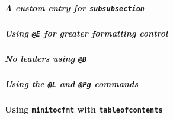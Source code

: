 \documentclass{article}
\makeatletter
\def\cs#1{\texttt{\@backslashchar#1}}
\newcommand{\insMinitoc}[2][]{%
  \begin{center}#2
  \begin{minipage}[c]{0.8\linewidth}
  \insertminitoc[#1]
  \end{minipage}
  \end{center}
}
\makeatother
\begin{document}
\subparagraph{A custom entry for \protect\cs{subsubsection}} \leavevmode

\insMinitoc[CandM]\minitocFmtvi

\subparagraph{Using \texorpdfstring{\protect\cs{@E}}{\textbackslash{@E}} for greater formatting control} \leavevmode

\begin{minitocfmt}{\minitocFmtF}
  {\@W{2em}\@D{0em}
   }
  {\@W{2.5em}\@D{2em}
   {\@F{\color{blue}}}{}}
\end{minitocfmt}
\insMinitoc[CandM]{\minitocFmtF}

\subparagraph{No leaders using \texorpdfstring{\protect\cs{@B}}{\textbackslash{@B}}} \leavevmode

\begin{minitocfmt}{\minitocFmtB}
  {\vspace{6pt}\@W{2em}\@B{0em}\@F{\bfseries}\@N{\bfseries}\@P{\bfseries}}
  {\@W{2.5em}\@D{2em}}
\end{minitocfmt}

\insMinitoc[CandM]\minitocFmtB

\subparagraph{Using the
  \texorpdfstring{\protect\cs{@L} and \protect\cs{@Pg}}{\textbackslash{@L}
    and \textbackslash{@Pg}} commands} \leavevmode

\begin{minitocfmt}{\minitocFmtPara} %
\@A{\@PW{2.5em}\@R{7em}}
  {%
    \@W{3.2em}\@D{0em}
      {}
      {}
  }
  {%
    \@W{4.1em}\@D{3.2em}
      {}
      {}
  }
\end{minitocfmt}

\insMinitoc[SExmpls]{\minitocFmtPara}

\paragraph{Using \texorpdfstring{\texttt{minitocfmt} with \protect\cs{tableofcontents}}
  {minitocfmt with \textbackslash{tableofcontents}}}\leavevmode
\end{document}
